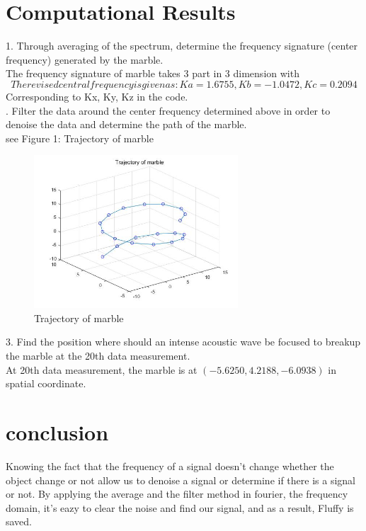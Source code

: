\documentclass[12pt,letterpaper]{article}
\begin{document}
\section{Computational Results}
1. Through averaging of the spectrum, determine the frequency signature (center frequency) generated by
the marble.\\
The frequency signature of marble takes 3 part in 3 dimension with 
\begin{equation}
	The revised central frequency is given as: 
Ka = 1.6755, Kb = -1.0472, Kc = 0.2094
\end{equation}
Corresponding to Kx, Ky, Kz in the code.\\
. Filter the data around the center frequency determined above in order to denoise the data and determine
the path of the marble. \\
see Figure 1: Trajectory of marble\\
\begin{figure}
    \centering
    \includegraphics[width=3.0in]{r1}
    \caption{Trajectory of marble}
    
\end{figure}
3. Find the position where should an intense acoustic wave be focused to breakup the marble at the 20th data measurement.\\
At 20th data measurement, the marble is at $ (-5.6250 ,4.2188, -6.0938)$ in spatial coordinate.

\section{conclusion}
Knowing the fact that the frequency of a signal doesn't change whether the object change or not allow us to denoise a signal or determine if there is a signal or not. By applying the average and the filter method in fourier, the frequency domain, it's eazy to clear the noise and find our signal, and as a result, Fluffy is saved.
\end{document}
